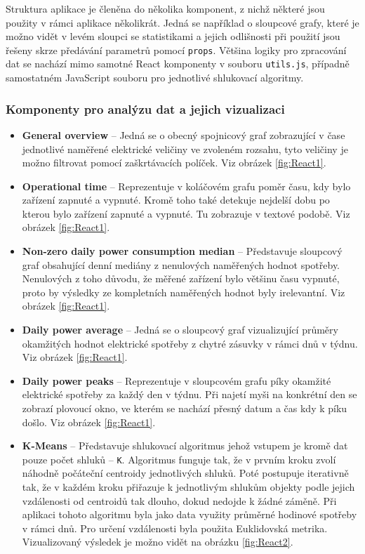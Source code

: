 \documentclass[czech,master,dept460,male,cpp,cpdeclaration,oneside]{diploma}
\begin{document}
Struktura aplikace je členěna do několika komponent, z nichž některé jsou použity v rámci aplikace několikrát. Jedná se například o sloupcové grafy, které je možno vidět v levém sloupci se statistikami a jejich odlišnosti při použití jsou řešeny skrze předávání parametrů pomocí \texttt{props}. Většina logiky pro zpracování dat se nachází mimo samotné React komponenty v souboru \texttt{utils.js}, případně samostatném JavaScript souboru pro jednotlivé shlukovací algoritmy.

\subsubsection*{Komponenty pro analýzu dat a jejich vizualizaci}
\begin{itemize}
	\item \textbf{General overview} – Jedná se o obecný spojnicový graf zobrazující v čase jednotlivé naměřené elektrické veličiny ve zvoleném rozsahu, tyto veličiny je možno filtrovat pomocí zaškrtávacích políček. Viz obrázek \ref{fig:React1}.
	\item \textbf{Operational time}	– Reprezentuje v koláčovém grafu poměr času, kdy bylo zařízení zapnuté a vypnuté. Kromě toho také detekuje nejdelší dobu po kterou bylo zařízení zapnuté a vypnuté. Tu zobrazuje v textové podobě. Viz obrázek \ref{fig:React1}.
	\item \textbf{Non-zero daily power consumption median} – Představuje sloupcový graf obsahující denní mediány z nenulových naměřených hodnot spotřeby. Nenulových z toho důvodu, že měřené zařízení bylo většinu času vypnuté, proto by výsledky ze kompletních naměřených hodnot byly irelevantní. Viz obrázek \ref{fig:React1}.
	\item \textbf{Daily power average} – Jedná se o sloupcový graf vizualizující průměry okamžitých hodnot elektrické spotřeby z chytré zásuvky v rámci dnů v týdnu. Viz obrázek \ref{fig:React1}.
	\item \textbf{Daily power peaks} – Reprezentuje v sloupcovém grafu píky okamžité elektrické spotřeby za každý den v týdnu. Při najetí myši na konkrétní den se zobrazí plovoucí okno, ve kterém se nachází přesný datum a čas kdy k píku došlo. Viz obrázek \ref{fig:React1}.
	\pagebreak
	\item \textbf{K-Means} – Představuje shlukovací algoritmus jehož vstupem je kromě dat pouze počet shluků – \texttt{K}. Algoritmus funguje tak, že v prvním kroku zvolí náhodně počáteční centroidy jednotlivých shluků. Poté postupuje iterativně tak, že v každém kroku přiřazuje k jednotlivým shlukům objekty podle jejich vzdálenosti od centroidů tak dlouho, dokud nedojde k žádné záměně. Při aplikaci tohoto algoritmu byla jako data využity průměrné hodinové spotřeby v rámci dnů. Pro určení vzdálenosti byla použita Euklidovská metrika. Vizualizovaný výsledek je možno vidět na obrázku \ref{fig:React2}.

\end{itemize}
\end{document}
